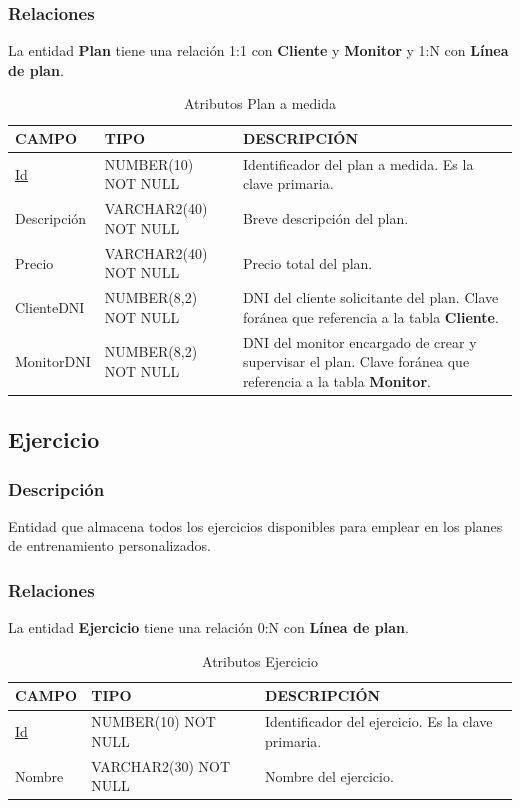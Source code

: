 \documentclass[12pt, a4paper]{article}
\begin{document}
	\subsubsection*{Relaciones}
	La entidad \textbf{Plan} tiene una relación 1:1 con \textbf{Cliente} y \textbf{Monitor} y 1:N con \textbf{Línea de plan}.
	\begin{table}[H]
		\centering
		\caption{Atributos Plan a medida}
		\begin{tabular}{@{} m{2.5cm} m{5.5cm} m{7cm} @{}}
			\toprule
			\textbf{CAMPO} & \textbf{TIPO} & \textbf{DESCRIPCIÓN} \\ \midrule
			\underline{Id} & NUMBER(10) NOT NULL & Identificador del plan a medida. Es la clave primaria. \\
			Descripción & VARCHAR2(40) NOT NULL & Breve descripción del plan. \\	
			Precio & VARCHAR2(40) NOT NULL & Precio total del plan. \\
			Cliente\textunderscore DNI & NUMBER(8,2) NOT NULL & DNI del cliente solicitante del plan. Clave foránea que referencia a la tabla \textbf{Cliente}. \\	
			Monitor\textunderscore DNI & NUMBER(8,2) NOT NULL & DNI del monitor encargado de crear y supervisar el plan. Clave foránea que referencia a la tabla \textbf{Monitor}. \\ \bottomrule
		\end{tabular}
	\end{table}
	
	\newpage
	\subsection{Ejercicio}
	\subsubsection*{Descripción}
	Entidad que almacena todos los ejercicios disponibles para emplear en los planes de entrenamiento personalizados.
	\subsubsection*{Relaciones}
	La entidad \textbf{Ejercicio} tiene una relación 0:N con \textbf{Línea de plan}.
	\begin{table}[H]
		\centering
		\caption{Atributos Ejercicio}
		\begin{tabular}{@{} m{2.5cm} m{5.5cm} m{7cm} @{}}
			\toprule
			\textbf{CAMPO} & \textbf{TIPO} & \textbf{DESCRIPCIÓN} \\ \midrule
			\underline{Id} & NUMBER(10) NOT NULL & Identificador del ejercicio. Es la clave primaria. \\ 
			Nombre & VARCHAR2(30) NOT NULL & Nombre del ejercicio. \\ \bottomrule
		\end{tabular}
	\end{table}
	
\end{document}
